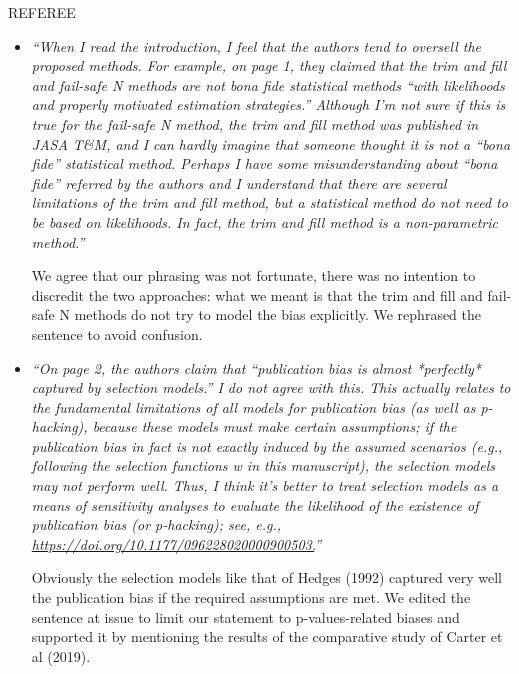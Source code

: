 \documentclass[11pt]{article}
\begin{document}
\vspace{2cm}

\begin{center}
REFEREE
\end{center}

\begin{itemize}
\item \emph{``When I read the introduction, I feel that the authors tend to oversell the proposed methods. For example, on page 1, they claimed that the trim and fill and fail-safe N methods are not bona fide statistical methods ``with likelihoods and properly motivated estimation strategies.'' Although I'm not sure if this is true for the fail-safe N method, the trim and fill method was published in JASA T\&M, and I can hardly imagine that someone thought it is not a ``bona fide'' statistical method. Perhaps I have some misunderstanding about ``bona fide'' referred by the authors and I understand that there are several limitations of the trim and fill method, but a statistical method do not need to be based on likelihoods. In fact, the trim and fill method is a non-parametric method.''}


We agree that our phrasing was not fortunate, there was no intention to discredit the two approaches: what we meant is that the trim and fill and fail-safe N methods do not try to model the bias explicitly. We rephrased the sentence to avoid confusion.


\item \emph{``On page 2, the authors claim that ``publication bias is almost *perfectly* captured by selection models.'' I do not agree with this. This actually relates to the fundamental limitations of all models for publication bias (as well as p-hacking), because these models must make certain assumptions; if the publication bias in fact is not exactly induced by the assumed scenarios (e.g., following the selection functions w in this manuscript), the selection models may not perform well. Thus, I think it's better to treat selection models as a means of sensitivity analyses to evaluate the likelihood of the existence of publication bias (or p-hacking); see, e.g., \url{https://doi.org/10.1177/096228020000900503.}''}

Obviously the selection models like that of Hedges (1992) captured very well the publication bias if the required assumptions are met. We edited the sentence at issue to limit our statement to p-values-related biases and supported it by mentioning the results of the comparative study of Carter et al (2019).





\end{itemize}
\end{document}
